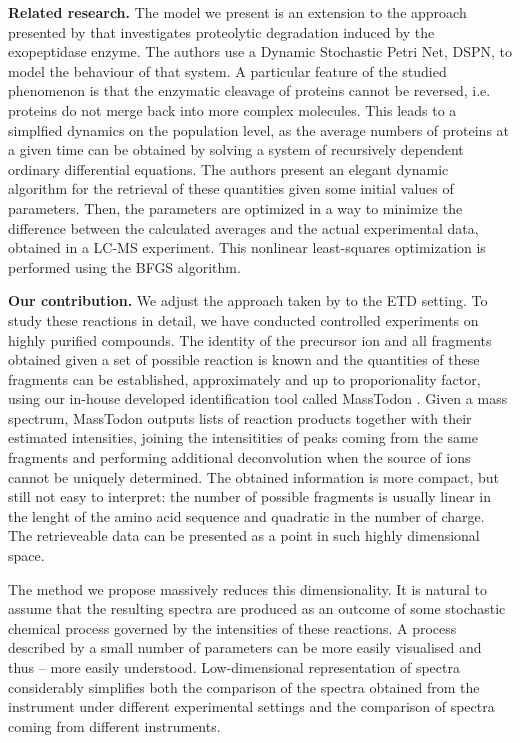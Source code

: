 \documentclass{llncs}
\begin{document}
\textbf{Related research.}
        The model we present is an extension to the approach presented by \cite{Gambin2010} that investigates proteolytic degradation induced by the exopeptidase enzyme. The authors use a Dynamic Stochastic Petri Net, DSPN, to model the behaviour of that system. A particular feature of the studied phenomenon is that the enzymatic cleavage of proteins cannot be reversed, i.e. proteins do not merge back into more complex molecules. This leads to a simplfied dynamics on the population level, as the average numbers of proteins at a given time can be obtained by solving a system of recursively dependent ordinary differential equations. The authors present an elegant dynamic algorithm for the retrieval of these quantities given some initial values of parameters. Then, the parameters are optimized in a way to minimize the difference between the calculated averages and the actual experimental data, obtained in a LC-MS experiment. This nonlinear least-squares optimization is performed using the BFGS algorithm.


\textbf{Our contribution.}
        We adjust the approach taken by \cite{Gambin2010} to the ETD setting. To study these reactions in detail, we have conducted controlled experiments on highly purified compounds. The identity of the precursor ion and all fragments obtained given a set of possible reaction is known and the quantities of these fragments can be established, approximately and up to proporionality factor, using our in-house developed identification tool called MassTodon \cite{LermyteIJMS2015,Lermyte2016}. Given a mass spectrum, MassTodon outputs lists of reaction products together with their estimated intensities, joining the intensitities of peaks coming from the same fragments and performing additional deconvolution when the source of ions cannot be uniquely determined. The obtained information is more compact, but still not easy to interpret: the number of possible fragments is usually linear in the lenght of the amino acid sequence and quadratic in the number of charge. The retrieveable data can be presented as a point in such highly dimensional space.

        The method we propose massively reduces this dimensionality. It is natural to assume that the resulting spectra are produced as an outcome of some stochastic chemical process governed by the intensities of these reactions. A process described by a small number of parameters can be more easily visualised and thus -- more easily understood. Low-dimensional representation of spectra considerably simplifies both the comparison of the spectra obtained from the instrument under different experimental settings and the comparison of spectra coming from different instruments.
\end{document}
